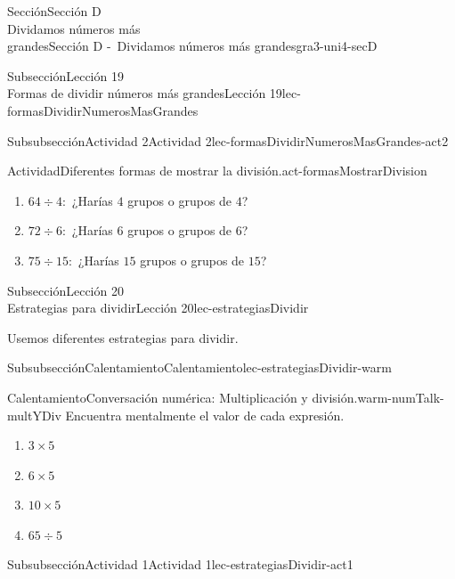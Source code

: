 \begin{sectionptx}{Sección}{{\Large Sección D\\}Dividamos números más\\grandes}{}{Sección D -~Dividamos números más grandes}{}{}{gra3-uni4-secD}
\begin{subsectionptx}{Subsección}{{\normalsize Lección 19\\[-0.05cm]}Formas de dividir números más grandes}{}{Lección 19}{}{}{lec-formasDividirNumerosMasGrandes}
\begin{subsubsectionptx}{Subsubsección}{Actividad 2}{}{Actividad 2}{}{}{lec-formasDividirNumerosMasGrandes-act2}
\begin{activity}{Actividad}{Diferentes formas de mostrar la división.}{act-formasMostrarDivision}
\begin{enumerate}
%
\begin{enumerate}
\item{}\(64 \div 4:\) ¿Harías \(4\) grupos o grupos de \(4\)?%
\item{}\(72 \div 6:\) ¿Harías \(6\) grupos o grupos de \(6\)?%
\item{}\(75 \div 15:\) ¿Harías \(15\) grupos o grupos de \(15\)?%
\end{enumerate}
\end{enumerate}
\end{activity}%
\end{subsubsectionptx}
\end{subsectionptx}
%
%
\typeout{************************************************}
\typeout{************************************************}
%
\clearpage
\begin{subsectionptx}{Subsección}{{\normalsize Lección 20\\[-0.05cm]}Estrategias para dividir}{}{Lección 20}{}{}{lec-estrategiasDividir}
\begin{introduction}{}%
Usemos diferentes estrategias para dividir.%
\end{introduction}%
%
%
\typeout{************************************************}
\typeout{************************************************}
%
\begin{subsubsectionptx}{Subsubsección}{Calentamiento}{}{Calentamiento}{}{}{lec-estrategiasDividir-warm}
\begin{exploration}{Calentamiento}{Conversación numérica: Multiplicación y división.}{warm-numTalk-multYDiv}%
Encuentra mentalmente el valor de cada expresión.%
%
\begin{enumerate}[label={\Alph*.}]
\item{}\(\displaystyle 3\times 5\)%
\item{}\(\displaystyle 6\times 5\)%
\item{}\(\displaystyle 10\times 5\)%
\item{}\(\displaystyle 65\div 5\)%
\end{enumerate}
\end{exploration}%
\end{subsubsectionptx}
%
%
\typeout{************************************************}
\typeout{************************************************}
%
\begin{subsubsectionptx}{Subsubsección}{Actividad 1}{}{Actividad 1}{}{}{lec-estrategiasDividir-act1}

\end{subsubsectionptx}
\end{subsectionptx}
\end{sectionptx}
